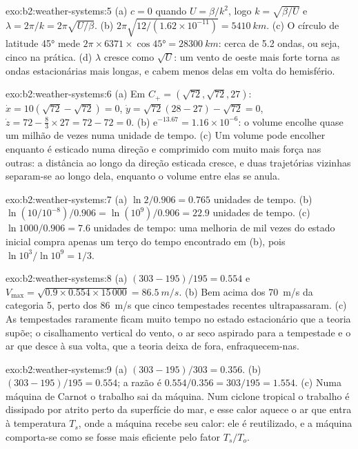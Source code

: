 \begin{solution}{exo:b2:weather-systems:5}
(a) $c = 0$ quando $U = \beta/k^2$, logo $k = \sqrt{\beta/U}$ e $\lambda = 2\pi/k =
2\pi\sqrt{U/\beta}$. (b) $2\pi\sqrt{12/(1.62 \times 10^{-11})} = \qty{5410}{km}$. (c) O círculo
de latitude \ang{45} mede $2\pi \times 6371 \times \cos\ang{45} = \qty{28300}{km}$: cerca de 5.2
ondas, ou seja, cinco na prática. (d) $\lambda$ cresce como $\sqrt U$: um vento de oeste mais forte torna as
ondas estacionárias mais longas, e cabem menos delas em volta do hemisfério.
\end{solution}

\begin{solution}{exo:b2:weather-systems:6}
(a) Em $C_+ = (\sqrt{72}, \sqrt{72}, 27)$: $\dot x = 10(\sqrt{72} - \sqrt{72}) = 0$, $\dot y =
\sqrt{72}(28 - 27) - \sqrt{72} = 0$, $\dot z = 72 - \tfrac83 \times 27 = 72 - 72 = 0$.
(b) $\mathrm{e}^{-13.67} = 1.16 \times 10^{-6}$: o volume encolhe quase um milhão de vezes numa
unidade de tempo. (c) Um volume pode encolher enquanto é esticado numa direção e comprimido com muito mais
força nas outras: a distância ao longo da direção esticada cresce, e duas trajetórias vizinhas
separam-se ao longo dela, enquanto o volume entre elas se anula.
\end{solution}

\begin{solution}{exo:b2:weather-systems:7}
(a) $\ln 2/0.906 = 0.765$ unidades de tempo. (b) $\ln(10/10^{-8})/0.906 = \ln(10^9)/0.906 = 22.9$ unidades
de tempo. (c) $\ln 1000/0.906 = 7.6$ unidades de tempo: uma melhoria de mil vezes do estado inicial
compra apenas um terço do tempo encontrado em (b), pois $\ln 10^3/\ln 10^9 = 1/3$.
\end{solution}

\begin{solution}{exo:b2:weather-systems:8}
(a) $(303 - 195)/195 = 0.554$ e $V_{\max} = \sqrt{0.9 \times 0.554 \times 15\,000} =
\qty{86.5}{m/s}$. (b) Bem acima dos \qty{70}{m/s} da categoria 5, perto dos \qty{86}{m/s} que
cinco tempestades recentes ultrapassaram. (c) As tempestades raramente ficam muito tempo no estado estacionário que a teoria
supõe; o cisalhamento vertical do vento, o ar seco aspirado para a tempestade e o ar que desce à sua volta, que
a teoria deixa de fora, enfraquecem-nas.
\end{solution}

\begin{solution}{exo:b2:weather-systems:9}
(a) $(303 - 195)/303 = 0.356$. (b) $(303 - 195)/195 = 0.554$; a razão é $0.554/0.356 =
303/195 = 1.554$. (c) Numa máquina de Carnot o trabalho sai da máquina. Num ciclone tropical o
trabalho é dissipado por atrito perto da superfície do mar, e esse calor aquece o ar que entra à
temperatura $T_s$, onde a máquina recebe seu calor: ele é reutilizado, e a máquina comporta-se
como se fosse mais eficiente pelo fator $T_s/T_o$.
\end{solution}

